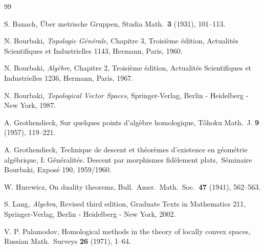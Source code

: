 \documentclass[12pt]{amsart}
\theoremstyle{theorem}
\theoremstyle{definition}
\theoremstyle{remark} \theoremstyle{question} \theoremstyle{example}
\begin{document}
\begin{thebibliography}{99}

    S. Banach,
    {\"Uber} metrische Gruppen,
    Studia Math.\ {\bf 3} (1931), 101--113.

    N. Bourbaki,
    {\it Topologie Générale}, Chapitre 3, Troisi\`eme \'edition,
    Actualit\'es Scientifiques et Industrielles 1143, Hermann, Paris, 1960.    

    N. Bourbaki,
    {\it Alg\`ebre}, Chapitre 2, Troisi\`eme \'edition,
    Actualit\'es Scientifiques et Industrielles 1236, Hermann, Paris, 1967.

    N. Bourbaki,
    {\it Topological Vector Spaces},
    Springer-Verlag, Berlin - Heidelberg - New York, 1987.

    A. Grothendieck,
    Sur quelques points d'alg\`ebre homologique,
    T\^ohoku Math.\ J. {\bf 9} (1957), 119--221.

    A. Grothendieck,
    Technique de descent et th\'eor\`emes d'existence en g\'eom\'etrie
    alg\'ebrique, I: G\'en\'eralit\'es. Descent par morphismes fid\`element
    plats,\, S\'eminaire Bourbaki, Expos\'e 190, 1959/1960.

    W. Hurewicz,
    On duality theorems,
    Bull.\ Amer.\ Math.\ Soc.\ {\bf 47} (1941), 562--563.

    S. Lang,
    {\it Algebra}, Revised third edition,
    Graduate Texts in Mathematics 211, Springer-Verlag, Berlin - Heidelberg - New York, 2002.

    V. P. Palamodov,
    Homological methods in the theory of locally convex spaces,
    Russian Math.\ Surveys {\bf 26} (1971), 1--64.

\end{thebibliography}
\end{document}
